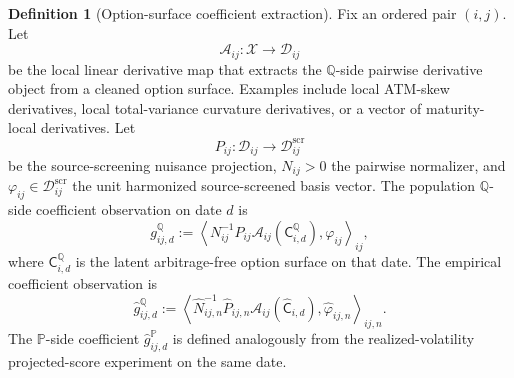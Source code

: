 \documentclass[11pt,a4paper]{amsart}
\theoremstyle{plain}
\theoremstyle{definition}
\newtheorem{definition}[theorem]{Definition}
\theoremstyle{remark}
\newcommand{\PP}{\mathbb{P}}
\newcommand{\QQ}{\mathbb{Q}}
\newcommand{\cA}{\mathcal{A}}
\newcommand{\cD}{\mathcal{D}}
\newcommand{\cX}{\mathcal{X}}
\begin{document}
\begin{definition}[Option-surface coefficient extraction]\label{def:surface-coeff-extraction}
Fix an ordered pair \((i,j)\).  Let
\[
        \cA_{ij}:\cX\to\cD_{ij}
\]
be the local linear derivative map that extracts the \(\QQ\)-side pairwise derivative object from a
cleaned option surface.  Examples include local ATM-skew derivatives, local total-variance
curvature derivatives, or a vector of maturity-local derivatives.  Let
\[
        P_{ij}:\cD_{ij}\to\cD_{ij}^{\mathrm{scr}}
\]
be the source-screening nuisance projection, \(N_{ij}>0\) the pairwise normalizer, and
\(\varphi_{ij}\in\cD_{ij}^{\mathrm{scr}}\) the unit harmonized source-screened basis vector.  The
population \(\QQ\)-side coefficient observation on date \(d\) is
\[
        g_{ij,d}^{\QQ}
        :=
        \left\langle
                N_{ij}^{-1}P_{ij}\cA_{ij}(\mathsf C_{i,d}^{\QQ}),
                \varphi_{ij}
        \right\rangle_{ij},
\]
where \(\mathsf C_{i,d}^{\QQ}\) is the latent arbitrage-free option surface on that date.  The empirical
coefficient observation is
\[
        \widehat g_{ij,d}^{\QQ}
        :=
        \left\langle
                \widehat N_{ij,n}^{-1}\widehat P_{ij,n}\cA_{ij}(\widehat{\mathsf C}_{i,d}),
                \widehat\varphi_{ij,n}
        \right\rangle_{ij,n}.
\]
The \(\PP\)-side coefficient \(\widehat g_{ij,d}^{\PP}\) is defined analogously from the
realized-volatility projected-score experiment on the same date.
\end{definition}
\end{document}
